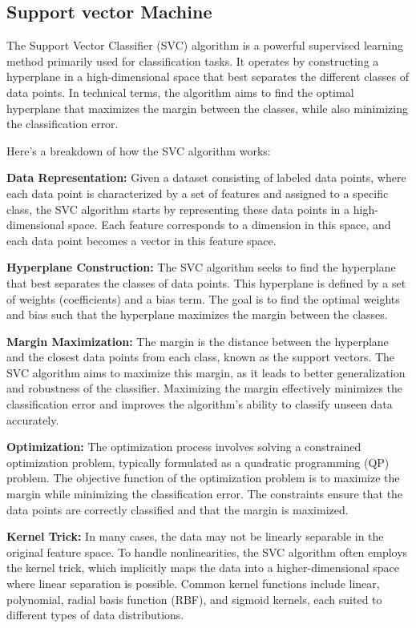 \documentclass[preprint,aps,nofootinbib,a4paper,superscriptaddress,longbibliography,amsfonts,amssymb,amsmath,titlepage]{revtex4-2}
\begin{document}
\subsection{Support vector Machine}

The Support Vector Classifier (SVC) algorithm is a powerful supervised learning method primarily used for classification tasks. It operates by constructing a hyperplane in a high-dimensional space that best separates the different classes of data points. In technical terms, the algorithm aims to find the optimal hyperplane that maximizes the margin between the classes, while also minimizing the classification error.

Here's a breakdown of how the SVC algorithm works:

\textbf{Data Representation:} Given a dataset consisting of labeled data points, where each data point is characterized by a set of features and assigned to a specific class, the SVC algorithm starts by representing these data points in a high-dimensional space. Each feature corresponds to a dimension in this space, and each data point becomes a vector in this feature space.

\textbf{Hyperplane Construction:} The SVC algorithm seeks to find the hyperplane that best separates the classes of data points. This hyperplane is defined by a set of weights (coefficients) and a bias term. The goal is to find the optimal weights and bias such that the hyperplane maximizes the margin between the classes.

\textbf{Margin Maximization:} The margin is the distance between the hyperplane and the closest data points from each class, known as the support vectors. The SVC algorithm aims to maximize this margin, as it leads to better generalization and robustness of the classifier. Maximizing the margin effectively minimizes the classification error and improves the algorithm's ability to classify unseen data accurately.

\textbf{Optimization:} The optimization process involves solving a constrained optimization problem, typically formulated as a quadratic programming (QP) problem. The objective function of the optimization problem is to maximize the margin while minimizing the classification error. The constraints ensure that the data points are correctly classified and that the margin is maximized.

\textbf{Kernel Trick:} In many cases, the data may not be linearly separable in the original feature space. To handle nonlinearities, the SVC algorithm often employs the kernel trick, which implicitly maps the data into a higher-dimensional space where linear separation is possible. Common kernel functions include linear, polynomial, radial basis function (RBF), and sigmoid kernels, each suited to different types of data distributions.
\end{document}
